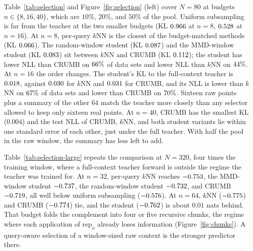 \documentclass[11pt]{article}
\newcommand{\rep}{\mathrm{rep}}
\begin{document}
Table~\ref{tab:selection} and Figure~\ref{fig:selection} (left) cover
$N = 80$ at budgets $n \in \{8, 16, 40\}$, which are $10\%$, $20\%$, and
$50\%$ of the pool. Uniform subsampling is far from the teacher at the two
smaller budgets (KL $0.966$ at $n = 8$, $0.528$
at $n = 16$). At $n = 8$, per-query $k$NN is the closest of the
budget-matched methods (KL $0.066$). The random-window student
(KL $0.087$) and the MMD-window student (KL $0.083$)
sit between $k$NN and CRUMB (KL $0.112$); the student has lower
NLL than CRUMB on $66\%$ of data sets and lower NLL than
$k$NN on $44\%$. At $n = 16$ the order changes. The student's
KL to the full-context teacher is $0.018$, against
$0.030$ for $k$NN and $0.031$ for CRUMB, and its
NLL is lower than $k$NN on $67\%$ of data sets and lower
than CRUMB on $70\%$. Sixteen raw points plus a summary of
the other $64$ match the teacher more closely than any selector allowed to
keep only sixteen real points. At $n = 40$, CRUMB has the smallest KL
($0.004$) and the test NLL of CRUMB, $k$NN, and both student variants lie
within one standard error of each other, just under the full teacher. With
half the pool in the raw window, the summary has less left to add.

\begin{table}[t]
\centering
\caption{Past the teacher's window ($N = 320$, $64$ data sets). The teacher
is not run on all $320$ points. Entries are bar-distribution test NLL.
Bold is the lowest mean at that budget. Mean $\pm$ s.e.}
\label{tab:selection-large}

\end{table}

Table~\ref{tab:selection-large} repeats the comparison at $N = 320$, four
times the training window, where a full-context teacher forward is outside
the regime the teacher was trained for. At $n = 32$, per-query $k$NN
reaches $-0.753$, the MMD-window student
$-0.737$, the random-window student
$-0.732$, and CRUMB $-0.719$, all well
below uniform subsampling ($-0.576$). At $n = 64$,
$k$NN ($-0.775$) and CRUMB ($-0.774$)
tie, and the student ($-0.762$) is about $0.01$ nats
behind. That budget folds the complement into four or five recursive
chunks, the regime where each application of $\rep_\phi$ already loses
information (Figure~\ref{fig:chunks}). A query-aware selection of a
window-sized raw context is the stronger predictor there.
\end{document}
